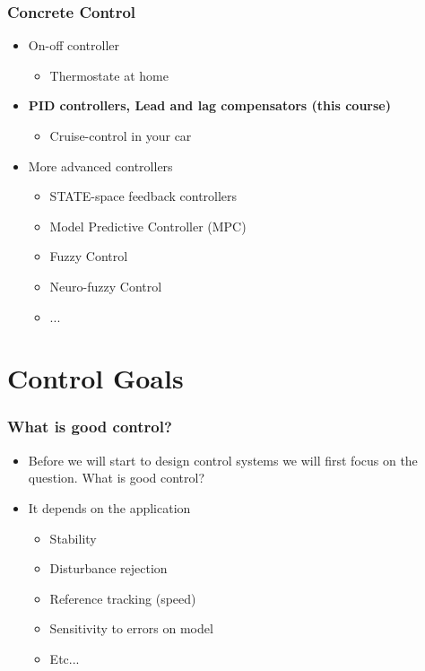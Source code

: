 \begin{frame}
	\frametitle{Concrete Control}
	\begin{itemize}
		\item On-off controller
		\begin{itemize}
			\item Thermostate at home
		\end{itemize}
		\item \textbf{PID controllers, Lead and lag compensators (this course)}
		\begin{itemize}
			\item Cruise-control in your car
		\end{itemize}
		\item More advanced controllers
		\begin{itemize}
			\item STATE-space feedback controllers
			\item Model Predictive Controller (MPC)
			\item Fuzzy Control
			\item Neuro-fuzzy Control
			\item ...
		\end{itemize}
	\end{itemize}
\end{frame}


\section{Control Goals}
\begin{frame}
	\frametitle{What is good control?}
	\begin{itemize}
		\item Before we will start to design control systems we will first focus on the question. What is good control?
		\item It depends on the application
		\begin{itemize}
			\item Stability
			\item Disturbance rejection
			\item Reference tracking (speed)
			\item Sensitivity to errors on model
			\item Etc...
		\end{itemize}
	\end{itemize}
\end{frame}


